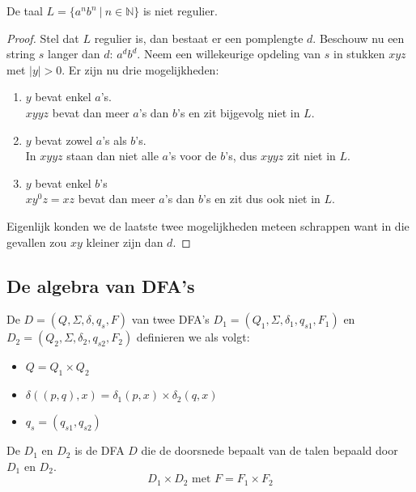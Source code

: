 \documentclass[main.tex]{subfiles}
\begin{document}
\begin{st}
  De taal $L= \{ a^{n}b^{n} \ |\ n\in \mathbb{N} \} $ is niet regulier.

  \begin{proof}
    Stel dat $L$ regulier is, dan bestaat er een pomplengte $d$.
    Beschouw nu een string $s$ langer dan $d$: $a^{d}b^{d}$.
    Neem een willekeurige opdeling van $s$ in stukken $xyz$ met $|y| > 0$.
    Er zijn nu drie mogelijkheden:
    \begin{enumerate}
    \item $y$ bevat enkel $a$'s.\\
      $xyyz$ bevat dan meer $a$'s dan $b$'s en zit bijgevolg niet in $L$.
    \item $y$ bevat zowel $a$'s als $b$'s.\\
      In $xyyz$ staan dan niet alle $a$'s voor de $b$'s, dus $xyyz$ zit niet in $L$.
    \item $y$ bevat enkel $b$'s\\
      $xy^{0}z = xz$ bevat dan meer $a$'s dan $b$'s en zit dus ook niet in $L$.
    \end{enumerate}
    Eigenlijk konden we de laatste twee mogelijkheden meteen schrappen want in die gevallen zou $xy$ kleiner zijn dan $d$.
  \end{proof}
\end{st}

\subsection{De algebra van DFA's}
\label{sec:de-algebra-van-DFAs}

\begin{de}
  De  $D = (Q,\Sigma, \delta, q_{s},F)$ van twee DFA's $D_{1} = (Q_{1},\Sigma, \delta_{1}, q_{s1},F_{1})$ en $D_{2} = (Q_{2},\Sigma, \delta_{2}, q_{s2},F_{2})$ definieren we als volgt:
  \begin{itemize}
  \item $Q = Q_{1}\times Q_{2}$
  \item $\delta((p, q),x) = \delta_{1}(p,x) \times \delta_{2}(q,x)$
  \item $q_{s} = (q_{s1}, q_{s2})$
  \end{itemize}
\end{de}

\begin{de}
  De  $D_{1}$ en $D_{2}$ is de DFA $D$ die de doorsnede bepaalt van de talen bepaald door $D_{1}$ en $D_{2}$.
  \[ D_{1} \times D_{2} \text{ met } F = F_{1} \times F_{2} \]
\end{de}
\end{document}
